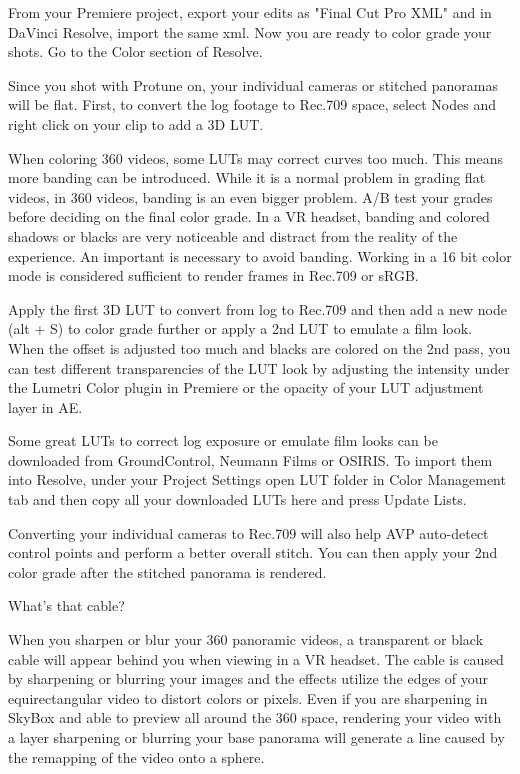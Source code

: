 \begin{fullwidth}
From your Premiere project, export your edits as "Final Cut Pro XML" and in DaVinci Resolve, import the same xml. Now you are ready to color grade your shots. Go to the Color section of Resolve.


Since you shot with Protune on, your individual cameras or stitched panoramas will be flat. First, to convert the log footage to Rec.709 space, select Nodes and right click on your clip to add a 3D LUT. 


When coloring 360 videos, some LUTs may correct curves too much. This means more banding can be introduced. While it is a normal problem in grading flat videos, in 360 videos, banding is an even bigger problem. A/B test your grades before deciding on the final color grade. In a VR headset, banding and colored shadows or blacks are very noticeable and distract from the reality of the experience. An important \textbf{} is necessary to avoid banding. Working in a 16 bit color mode is considered sufficient to render frames in Rec.709 or sRGB.


Apply the first 3D LUT to convert from log to Rec.709 and then add a new node (alt + S) to color grade further or apply a 2nd LUT to emulate a film look. When the offset is adjusted too much and blacks are colored on the 2nd pass, you can test different transparencies of the LUT look by adjusting the intensity under the Lumetri Color plugin in Premiere or the opacity of your LUT adjustment layer in AE.


\tip Some great LUTs to correct log exposure or emulate film looks can be downloaded from GroundControl, Neumann Films or OSIRIS. To import them into Resolve, under your Project Settings open LUT folder in Color Management tab and then copy all your downloaded LUTs here and press Update Lists.  

Converting your individual cameras to Rec.709 will also help AVP auto-detect control points and perform a better overall stitch. You can then apply your 2nd color grade after the stitched panorama is rendered.

{\large What's that cable? \par}

When you sharpen or blur your 360 panoramic videos, a transparent or black cable will appear behind you when viewing in a VR headset. The cable is caused by sharpening or blurring your images and the effects utilize the edges of your equirectangular video to distort colors or pixels. Even if you are sharpening in SkyBox and able to preview all around the 360 space, rendering your video with a layer sharpening or blurring your base panorama will generate a line caused by the remapping of the video onto a sphere.


\end{fullwidth}
